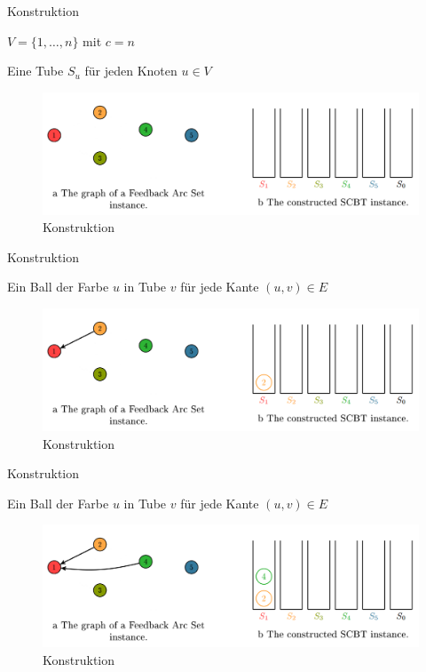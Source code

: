 \documentclass{beamer}
\begin{document}
\begin{frame}{Konstruktion}
\begin{pointlist}
\item $V=\{1,\dots,n\}$ mit $c=n$
\item Eine Tube $S_u$ für jeden Knoten $u\in V$
\end{pointlist}
\begin{figure}[ht]
		\includegraphics[width=\textwidth]{construct10}
		\caption{Konstruktion}
    \end{figure}
\end{frame}

\begin{frame}{Konstruktion}
\begin{pointlist}
\item Ein Ball der Farbe $u$ in Tube $v$ für jede Kante $(u,v)\in E$
\end{pointlist}
\begin{figure}[ht]
		\includegraphics[width=\textwidth]{construct09}
		\caption{Konstruktion}
    \end{figure}
\end{frame}

\begin{frame}{Konstruktion}
\begin{pointlist}
\item Ein Ball der Farbe $u$ in Tube $v$ für jede Kante $(u,v)\in E$
\end{pointlist}
\begin{figure}[ht]
		\includegraphics[width=\textwidth]{construct08}
		\caption{Konstruktion}
    \end{figure}
\end{frame}
\end{document}
